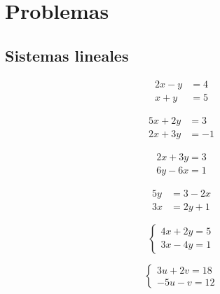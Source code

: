 \section*{Problemas}


\subsection*{Sistemas lineales}


\begin{problema}
	\begin{align*}
		2x-y&=4\\
		x+y&=5
	\end{align*}

\end{problema}




\begin{problema}
	\begin{align*}
		5x+2y&=3\\
		2x+3y&=-1
	\end{align*}

\end{problema}




\begin{problema}
	\begin{align*}
		2x+3y=3\\
		6y-6x=1
	\end{align*}

\end{problema}




\begin{problema}
	\begin{align*}
		5y&=3-2x\\
		3x&=2y+1
	\end{align*}

\end{problema}



\begin{problema}
	\label{spi:28.4a}
	$$
	\begin{cases}
		4x+2y=5\\
		3x-4y=1
	\end{cases}
	$$
\end{problema}




\begin{problema}
	\label{spi:28.4b}
	$$
	\begin{cases}
		3u+2v=18\\
		-5u-v=12
	\end{cases}
	$$
\end{problema}


